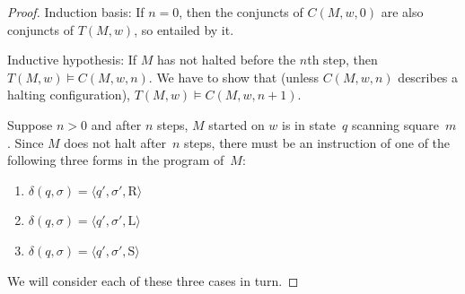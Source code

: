 \documentclass[10pt,a4paper]{article}
\theoremstyle{plain}
\theoremstyle{definition}
\theoremstyle{remark}
\newcommand*{\ollabel}[1]{\label{#1}}
\providecommand{\Entails}{\mathrel{\models}}
\providecommand{\tuple}[1]{\langle #1 \rangle}
\providecommand{\TMstay}{\mathrm{S}}
\providecommand{\TMright}{\mathrm{R}}
\providecommand{\TMleft}{\mathrm{L}}
\begin{document}
\begin{proof}
Induction basis: If $n = 0$, then the conjuncts of $C(M, w, 0)$ are
also conjuncts of $T(M, w)$, so entailed by it.

Inductive hypothesis: If $M$ has not halted before the $n$th step,
then $T(M,w) \Entails C(M, w, n)$. We have to show that (unless
$C(M, w, n)$ describes a halting configuration), $T(M, w) \Entails
C(M, w, n+1)$.

Suppose $n > 0$ and after $n$ steps, $M$ started on $w$ is in
state~$q$ scanning square~$m$. Since $M$ does not halt after~$n$
steps, there must be an instruction of one of the following three
forms in the program of~$M$:

\begin{enumerate} 
\item \ollabel{right} $\delta(q, \sigma) = \tuple{q', \sigma', \TMright}$

\item \ollabel{left} $\delta(q, \sigma) = \tuple{q', \sigma', \TMleft}$

\item \ollabel{stay} $\delta(q, \sigma) = \tuple{q', \sigma', \TMstay}$
\end{enumerate}

We will consider each of these three cases in turn. 


\end{proof}
\end{document}
